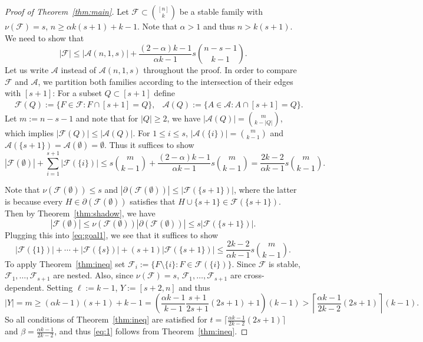 \documentclass{amsart}
\theoremstyle{plain}
\numberwithin{equation}{section}
\numberwithin{theorem}{section}
\numberwithin{case}{section}
\numberwithin{subcase}{case}
\begin{document}
\begin{proof}[Proof of Theorem~\ref{thm:main}]
Let ${\mathcal{F}}\subset \binom{[n]}k$ be a stable family with $\nu({\mathcal{F}})=s$, $n\ge {\alpha} k (s+1) + k-1$.
Note that ${\alpha}>1$ and thus $n > k (s+1)$.
We need to show that
\begin{equation*}
|{\mathcal{F}}|\le |{\mathcal{A}}(n,1,s)| + \frac{(2-{\alpha})k-1}{{\alpha} k-1}s\binom{n-s-1}{k-1}.
\end{equation*}
Let us write ${\mathcal{A}}$ instead of ${\mathcal{A}}(n,1,s)$ throughout the proof.
In order to compare ${\mathcal{F}}$ and ${\mathcal{A}}$, we partition both families according to the intersection of their edges with $[s+1]$: For a subset $Q\subset [s+1]$ define
\begin{align*}
&{\mathcal{F}}(Q):= \{F\in {\mathcal{F}}: F\cap[s+1]=Q\},
&{\mathcal{A}}(Q):= \{A\in {\mathcal{A}}: A\cap[s+1]=Q\}.
\end{align*}
Let $m:=n-s-1$ and note that for $|Q|\ge 2$, we have $|{\mathcal{A}}(Q)|=\binom{m}{k-|Q|}$, which implies $|{\mathcal{F}}(Q)|\le |{\mathcal{A}}(Q)|$.
For $1\le i\le s$, $|{\mathcal{A}}(\{i\})|=\binom{m}{k-1}$ and ${\mathcal{A}}(\{s+1\})={\mathcal{A}}(\emptyset)=\emptyset$.
Thus it suffices to show
\begin{equation}\label{eq:goal1}
|{\mathcal{F}}(\emptyset)| + \sum_{i=1}^{s+1} |{\mathcal{F}}(\{i\})| \le s\binom{m}{k-1} + \frac{(2-{\alpha})k-1}{{\alpha} k-1}s\binom{m}{k-1} = \frac{2k-2}{{\alpha} k-1}s\binom{m}{k-1}.
\end{equation}

Note that $\nu({\mathcal{F}}(\emptyset))\le s$ and $|\partial ({\mathcal{F}}(\emptyset))| \le |{\mathcal{F}}(\{s+1\})|$, where the latter is because every $H\in \partial ({\mathcal{F}}(\emptyset))$ satisfies that $H\cup\{s+1\}\in {\mathcal{F}}(\{s+1\})$.
Then by Theorem~\ref{thm:shadow}, we have
\[
|{\mathcal{F}}(\emptyset)|\le \nu({\mathcal{F}}(\emptyset)) |\partial ({\mathcal{F}}(\emptyset))| \le s |{\mathcal{F}}(\{s+1\})|.
\]
Plugging this into \eqref{eq:goal1}, we see that it suffices to show
\begin{equation}\label{eq:1}
|{\mathcal{F}}(\{1\})|+\cdots+|{\mathcal{F}}(\{s\})|+\left( s +1 \right)|{\mathcal{F}}(\{s+1\})|\le \frac{2k-2}{{\alpha} k-1} s \binom{m}{k-1}.
\end{equation}
To apply Theorem~\ref{thm:ineq} set ${\mathcal{F}}_i:=\{F\setminus \{i\}:F\in {\mathcal{F}}(\{i\})\}$.
Since ${\mathcal{F}}$ is stable, ${\mathcal{F}}_1,\dots, {\mathcal{F}}_{s+1}$ are nested.
Also, since $\nu({\mathcal{F}})=s$, ${\mathcal{F}}_1,\dots, {\mathcal{F}}_{s+1}$ are cross-dependent.
Setting $\ell:=k-1$, $Y:=[s+2, n]$ and thus
\[
|Y|=m\ge ({\alpha} k-1)(s+1)+k-1 = \left( \frac{{\alpha} k-1}{k-1} \frac{s+1}{2s+1} (2s+1)+1\right)(k-1) > \left \lceil \frac{{\alpha} k-1}{2k-2} (2s+1) \right\rceil (k-1).
\]
So all conditions of Theorem~\ref{thm:ineq} are satisfied for $t=\lceil\frac{{\alpha} k-1}{2k-2} (2s+1)\rceil$ and $\beta =\frac{{\alpha} k-1}{2k-2}$, and thus \eqref{eq:1} follows from Theorem~\ref{thm:ineq}.
\end{proof}
\end{document}
